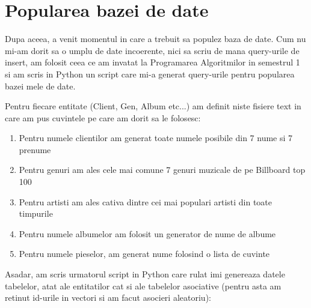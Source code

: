 \documentclass{article}
\begin{document}
\newpage
\section{Popularea bazei de date}

Dupa aceea, a venit momentul in care a trebuit sa populez baza de date. Cum nu mi-am dorit sa o umplu de date incoerente, nici sa scriu de mana query-urile de insert, am folosit ceea ce am invatat la Programarea Algoritmilor in semestrul 1 si am scris in Python un script care mi-a generat query-urile pentru popularea bazei mele de date.

Pentru fiecare entitate (Client, Gen, Album etc...) am definit niste fisiere text in care am pus cuvintele pe care am dorit sa le folosesc:
\begin{enumerate}
    \item Pentru numele clientilor am generat toate numele posibile din 7 nume si 7 prenume
    \item Pentru genuri am ales cele mai comune 7 genuri muzicale de pe Billboard top 100
    \item Pentru artisti am ales cativa dintre cei mai populari artisti din toate timpurile
    \item Pentru numele albumelor am folosit un generator de nume de albume
    \item Pentru numele pieselor, am generat nume folosind o lista de cuvinte
\end{enumerate}

Asadar, am scris urmatorul script in Python care rulat imi genereaza datele tabelelor, atat ale entitatilor cat si ale tabelelor asociative (pentru asta am retinut id-urile in vectori si am facut asocieri aleatoriu):
\end{document}
